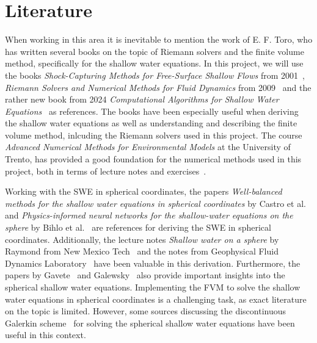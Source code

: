 \section{Literature}
When working in this area it is inevitable to mention the work of E. F. Toro, who has written several books on the topic of Riemann solvers and the finite volume method, specifically for the shallow water equations.
In this project, we will use the books \textit{Shock-Capturing Methods for Free-Surface Shallow Flows} from 2001~\cite{Toro2001-Shock}, \textit{Riemann Solvers and Numerical Methods for Fluid Dynamics} from 2009~\cite{Toro2009-Riemann} and the rather new book from 2024 \textit{Computational Algorithms for Shallow Water Equations}~\cite{Toro2024} as references.
The books have been especially useful when deriving the shallow water equations as well as understanding and describing the finite volume method, inlcuding the Riemann solvers used in this project.
The course \textit{Advanced Numerical Methods for Environmental Models} at the University of Trento, has provided a good foundation for the numerical methods used in this project, both in terms of lecture notes and exercises~\cite{trento_course}.

Working with the SWE in spherical coordinates, the papers \textit{Well-balanced methods for the shallow water equations in spherical coordinates} by Castro et al.~\cite{Castro2017} and \textit{Physics-informed neural networks for the shallow-water equations on the sphere} by Bihlo et al.~\cite{Bihlo2022} are references for deriving the SWE in spherical coordinates.
Additionally, the lecture notes \textit{Shallow water on a sphere} by Raymond from New Mexico Tech~\cite{Raymond} and the notes from Geophysical Fluid Dynamics Laboratory~\cite{shallow_water_gfdl} have been valuable in this derivation.
Furthermore, the papers by Gavete~\cite{Gavete_2009} and Galewsky~\cite{Galewsky_2004} also provide important insights into the spherical shallow water equations.
Implementing the FVM to solve the shallow water equations in spherical coordinates is a challenging task, as exact literature on the topic is limited.
However, some sources discussing the discontinuous Galerkin scheme~\cite{Hesthaven2008} for solving the spherical shallow water equations have been useful in this context.

